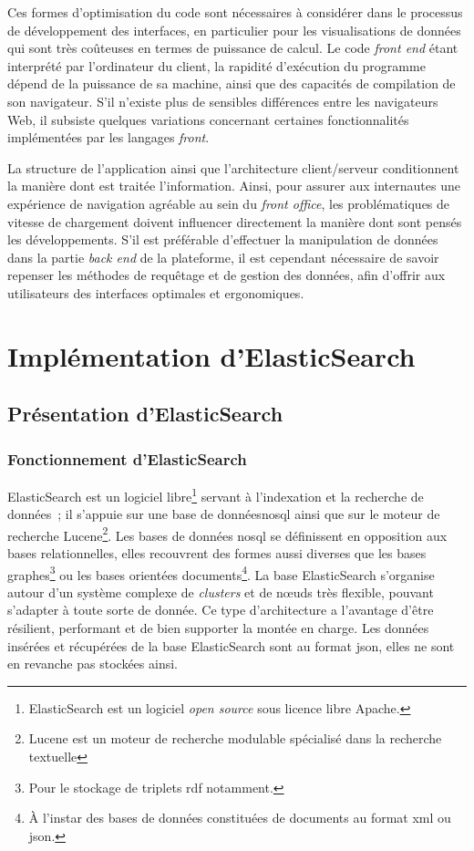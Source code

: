 \documentclass[a4paper,12pt,twoside]{book}
\newcommand{\eng}{\emph}
\newcommand{\bdd}{base de données\xspace}
\newcommand{\fo}{\eng{front office}\xspace}
\newcommand{\rdf}{\gls{rdf}\xspace}
\newcommand{\xml}{\gls{xml}\xspace}
\newcommand{\json}{\gls{json}\xspace}
\newcommand{\nosql}{\gls{nosql}\xspace}
\begin{document}
Ces formes d'optimisation du code sont nécessaires à considérer dans le processus de développement des interfaces, en particulier pour les visualisations de données qui sont très coûteuses en termes de puissance de calcul. Le code \eng{front end} étant interprété par l'ordinateur du client, la rapidité d'exécution du programme dépend de la puissance de sa machine, ainsi que des capacités de compilation de son navigateur. S'il n'existe plus de sensibles différences entre les navigateurs Web, il subsiste quelques variations concernant certaines fonctionnalités implémentées par les langages \eng{front}.

La structure de l'application ainsi que l'architecture client/serveur conditionnent la manière dont est traitée l'information. Ainsi, pour assurer aux internautes une expérience de navigation agréable au sein du \fo, les problématiques de vitesse de chargement doivent influencer directement la manière dont sont pensés les développements. S'il est préférable d'effectuer la manipulation de données dans la partie \eng{back end} de la plateforme, il est cependant nécessaire de savoir repenser les méthodes de requêtage et de gestion des données, afin d'offrir aux utilisateurs des interfaces optimales et ergonomiques.

	\section{Implémentation d'ElasticSearch\label{Elastic}}
		\subsection{Présentation d'ElasticSearch}
			\subsubsection{Fonctionnement d'ElasticSearch}
ElasticSearch est un logiciel libre\footnote{ElasticSearch est un logiciel \eng{open source} sous licence libre Apache.} servant à l'indexation et la recherche de données~; il s'appuie sur une \bdd \nosql ainsi que sur le moteur de recherche Lucene\footnote{Lucene est un moteur de recherche modulable spécialisé dans la recherche textuelle}. Les bases de données \nosql se définissent en opposition aux bases relationnelles, elles recouvrent des formes aussi diverses que les bases graphes\footnote{Pour le stockage de triplets \rdf notamment.} ou les bases orientées documents\footnote{À l'instar des bases de données constituées de documents au format \xml ou \json.}. La base ElasticSearch s'organise autour d'un système complexe de \eng{clusters} et de nœuds très flexible, pouvant s'adapter à toute sorte de donnée. Ce type d'architecture a l'avantage d'être résilient, performant et de bien supporter la montée en charge. Les données insérées et récupérées de la base ElasticSearch sont au format \json, elles ne sont en revanche pas stockées ainsi.
\end{document}

